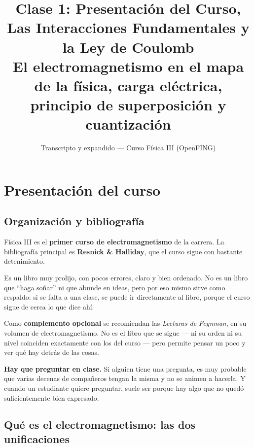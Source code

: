 \documentclass[12pt,a4paper]{article}
\title{\textbf{Clase 1: Presentación del Curso, Las Interacciones
        Fundamentales y la Ley de Coulomb}\\[0.3em]
        \large{El electromagnetismo en el mapa de la física, carga eléctrica,
              principio de superposición y cuantización}}
\author{Transcripto y expandido --- Curso Física III (OpenFING)}
\date{}
\begin{document}
\maketitle
\thispagestyle{empty}
\newpage

\tableofcontents
\newpage

\section{Presentación del curso}

\subsection{Organización y bibliografía}

Física III es el \textbf{primer curso de electromagnetismo} de la carrera. La
bibliografía principal es \textbf{Resnick \& Halliday}, que el curso sigue con
bastante detenimiento.

\begin{notebox}
Es un libro muy prolijo, con pocos errores, claro y bien ordenado. No es un libro
que \enquote{haga soñar} ni que abunde en ideas, pero por eso mismo sirve como
respaldo: si se falta a una clase, se puede ir directamente al libro, porque el
curso sigue de cerca lo que dice ahí.
\end{notebox}

Como \textbf{complemento opcional} se recomiendan las \emph{Lecturas de Feynman},
en su volumen de electromagnetismo. No es el libro que se sigue --- ni su orden
ni su nivel coinciden exactamente con los del curso --- pero permite pensar un
poco y ver qué hay detrás de las cosas.

\begin{notebox}
\textbf{Hay que preguntar en clase.} Si alguien tiene una pregunta, es muy
probable que varias decenas de compañeros tengan la misma y no se animen a
hacerla. Y cuando un estudiante quiere preguntar, suele ser porque hay algo que
no quedó suficientemente bien expresado.
\end{notebox}

\subsection{Qué es el electromagnetismo: las dos unificaciones}
\end{document}
